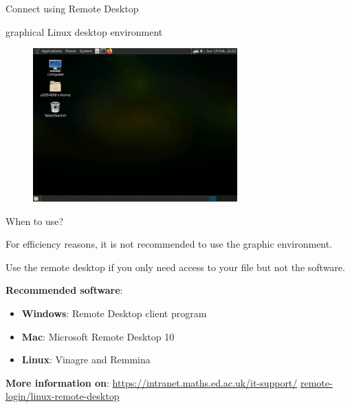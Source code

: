 \documentclass[10pt]{beamer}
\begin{document}
\begin{frame}[fragile]{Connect using Remote Desktop\footnotemark}

graphical Linux desktop environment

\begin{figure}[!ht]
\centering
\includegraphics[width = 0.7\textwidth]{images/Remote_Desktop.png}
\end{figure}


\end{frame}

\begin{frame}[fragile]{When to use? }

For efficiency reasons, it is not recommended to use the graphic environment. 

Use the remote desktop if you only need access to your file but not the software.

\textbf{Recommended software}: 

\begin{itemize}
    \item \textbf{Windows}: Remote Desktop client program
    \item \textbf{Mac}: Microsoft Remote Desktop 10
    \item \textbf{Linux}: Vinagre and Remmina
\end{itemize}

\hfill

\textbf{More information on}: \underline{https://intranet.maths.ed.ac.uk/it-support/} \underline{remote-login/linux-remote-desktop}

\end{frame}
\end{document}
